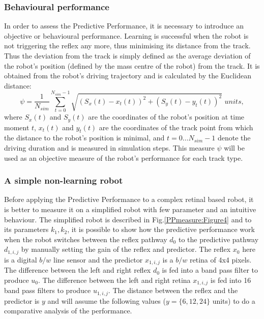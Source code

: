 \subsubsection{Behavioural performance}
In order to assess the Predictive Performance, it is necessary to introduce an objective 
or behavioural performance. 
Learning is successful when the robot is not triggering the reflex any more, thus
minimising its distance from the track.
Thus the deviation from the track is simply defined as the
average deviation of the robot's position (defined by the mass centre
of the robot) from the track.  It is obtained from the robot's driving
trajectory and is calculated by the Euclidean distance:
\begin{equation}
\psi=\frac{1}{N_{sim}} \sum_{t=0}^{N_{sim}-1} \sqrt{(S_x(t)-x_t(t))^2+(S_y(t)-y_t(t))^2} \,\, units,
\label{deviation}
\end{equation}
where $S_x(t)$ and $S_y(t)$ are the coordinates of the robot's
position at time moment $t$, $x_t(t)$ and $y_t(t)$ are the coordinates
of the track point from which the distance to the robot's position is
minimal, and $t=0\ldots N_{sim}-1$ denote the driving duration and is
measured in simulation steps.  This measure $\psi$ will be used as an
objective measure of the robot's performance for each track type.


\subsubsection{A simple non-learning robot}
Before applying the Predictive Performance to a complex retinal based robot, it is
better to measure it on a simplified robot with few parameter and an intuitive behaviour.
The simplified robot is described in Fig.\ref{PPmeasure:Figure4} and to its parameters $k_1,k_2$,
it is possible to show how the predictive performance work when the robot
switches between the reflex pathway $d_0$ to the predictive pathway $d_{1,i,j}$ by
manually setting the gain of the reflex and predictor. The reflex
$x_0$ here is a digital $b/w$ line sensor and the predictor $x_{1,i,j}$ is a
$b/w$ retina of 4x4 pixels. The difference between the left and right
reflex $d_{0}$ is fed into a band pass filter to produce $u_{0}$. The
difference between the left and right retina $x_{1,i,j}$ is fed into 16
band pass filters to produce $u_{1,i,j}$. The distance between the
reflex and the predictor is $y$ and will assume the following values ($y=\{6,12,24\}$ units) 
to do a comparative analysis of the performance.\\

